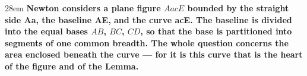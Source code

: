 \documentclass[border=4pt]{standalone}
\begin{document}
\begin{varwidth}{28em}
\large\bfseries
Newton considers a plane figure $AacE$ bounded by the straight side \textcolor{base}{Aa},
the baseline \textcolor{base}{AE}, and the curve \textcolor{curve}{acE}.
The baseline is divided into the equal bases $AB$, $BC$, $CD$, so that \textcolor{base}{the base}
is partitioned into segments of one common breadth.
The whole question concerns the area enclosed beneath \textcolor{curve}{the curve} —
for it is \textcolor{curve}{this curve} that is the heart of the figure and of the Lemma.
\end{varwidth}
\end{document}
